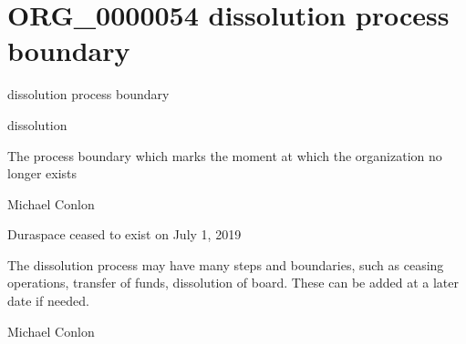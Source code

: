 \documentclass[letterpaper,10pt,english]{sphinxmanual}
\begin{document}
\section{ORG\_0000054 \sphinxhyphen{} dissolution process boundary}
\label{\detokenize{doc-ORG_0000054:org-0000054-dissolution-process-boundary}}\label{\detokenize{doc-ORG_0000054:index-0}}\label{\detokenize{doc-ORG_0000054::doc}}
\begin{sphinxShadowBox}

\sphinxAtStartPar
dissolution process boundary
\end{sphinxShadowBox}

\begin{sphinxShadowBox}

\sphinxAtStartPar
dissolution
\end{sphinxShadowBox}

\begin{sphinxShadowBox}

\sphinxAtStartPar
The process boundary which marks the moment at which the organization no longer exists
\end{sphinxShadowBox}

\begin{sphinxShadowBox}

\sphinxAtStartPar
Michael Conlon 
\end{sphinxShadowBox}

\begin{sphinxShadowBox}

\sphinxAtStartPar
Duraspace ceased to exist on July 1, 2019
\end{sphinxShadowBox}

\begin{sphinxShadowBox}

\sphinxAtStartPar
The dissolution process may have many steps and boundaries, such as ceasing operations, transfer of funds, dissolution of board.  These can be added at a later date if needed.
\end{sphinxShadowBox}

\begin{sphinxShadowBox}

\sphinxAtStartPar
Michael Conlon 
\end{sphinxShadowBox}
\begin{quote}
\label{\detokenize{doc-ORG_0000055:org-0000055}}\label{\detokenize{doc-ORG_0000055:succession-process}}\label{\detokenize{doc-ORG_0000055:org-0000055}}
\ignorespaces \end{quote}
\end{document}

